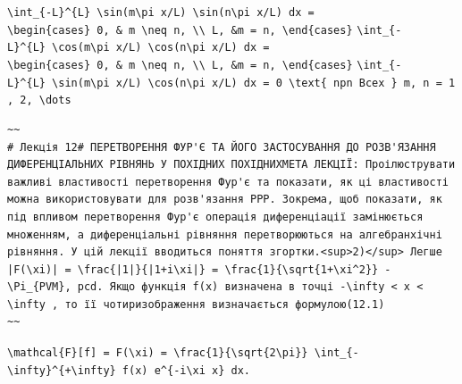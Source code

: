 \documentclass[
  ukrainian,
]{article}
\begin{document}
\texttt{\textbackslash{}int\_\{-L\}\^{}\{L\}\ \textbackslash{}sin(m\textbackslash{}pi\ x/L)\ \textbackslash{}sin(n\textbackslash{}pi\ x/L)\ dx\ =}
\texttt{\textbackslash{}begin\{cases\}\ 0,\ \&\ m\ \textbackslash{}neq\ n,\ \textbackslash{}\textbackslash{}\ L,\ \&m\ =\ n,\ \textbackslash{}end\{cases\}}
\texttt{\textbackslash{}int\_\{-L\}\^{}\{L\}\ \textbackslash{}cos(m\textbackslash{}pi\ x/L)\ \textbackslash{}cos(n\textbackslash{}pi\ x/L)\ dx\ =}
\texttt{\textbackslash{}begin\{cases\}\ 0,\ \&\ m\ \textbackslash{}neq\ n,\ \textbackslash{}\textbackslash{}\ L,\ \&m\ =\ n,\ \textbackslash{}end\{cases\}}
\texttt{\textbackslash{}int\_\{-L\}\^{}\{L\}\ \textbackslash{}sin(m\textbackslash{}pi\ x/L)\ \textbackslash{}cos(n\textbackslash{}pi\ x/L)\ dx\ =\ 0\ \textbackslash{}text\{\ npn\ Bcex\ \}\ m,\ n\ =\ 1,\ 2,\ \textbackslash{}dots}

\begin{verbatim}
~~
# Лекція 12# ПЕРЕТВОРЕННЯ ФУР'Є ТА ЙОГО ЗАСТОСУВАННЯ ДО РОЗВ'ЯЗАННЯ ДИФЕРЕНЦІАЛЬНИХ РІВНЯНЬ У ПОХІДНИХ ПОХІДНИХМЕТА ЛЕКЦІЇ: Проілюструвати важливі властивості перетворення Фур'є та показати, як ці властивості можна використовувати для розв'язання PPP. Зокрема, щоб показати, як під впливом перетворення Фур'є операція диференціації замінюється множенням, а диференціальні рівняння перетворюються на алгебранхічні рівняння. У цій лекції вводиться поняття згортки.<sup>2)</sup> Легше |F(\xi)| = \frac{|1|}{|1+i\xi|} = \frac{1}{\sqrt{1+\xi^2}} - \Pi_{PVM}, pcd. Якщо функція f(x) визначена в точці -\infty < x < \infty , то її чотиризображення визначається формулою(12.1)
~~
\end{verbatim}

\texttt{\textbackslash{}mathcal\{F\}{[}f{]}\ =\ F(\textbackslash{}xi)\ =\ \textbackslash{}frac\{1\}\{\textbackslash{}sqrt\{2\textbackslash{}pi\}\}\ \textbackslash{}int\_\{-\textbackslash{}infty\}\^{}\{+\textbackslash{}infty\}\ f(x)\ e\^{}\{-i\textbackslash{}xi\ x\}\ dx.}
\end{document}
